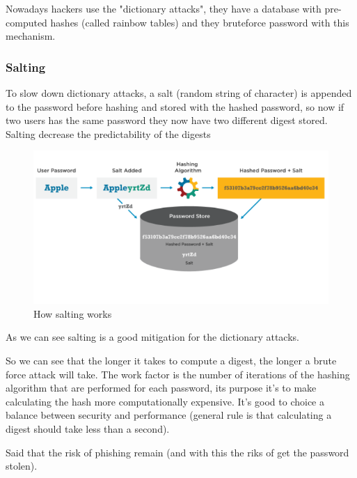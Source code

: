     Nowadays hackers use the "dictionary attacks", they have a database with pre-computed hashes (called rainbow tables) and they bruteforce password with this mechanism.
    
    \subsubsection{Salting}
    To slow down dictionary attacks, a salt (random string of character) is appended to the password before hashing and stored with the hashed password, so now if two users has the same password they now have two different digest stored. Salting decrease the predictability of the digests
    
    \begin{figure}[h!]
        \centering
        \includegraphics[scale=0.5]{images/prova.png}
        \caption{How salting works}
        \label{fig:salt}
    \end{figure}
    
    \FloatBarrier   
    
    As we can see salting is a good mitigation for the dictionary attacks.

    So we can see that the longer it takes to compute a digest, the longer a brute force attack will take. The work factor is the number of iterations of the hashing algorithm that are performed for each password, its purpose it's to make calculating the hash more computationally expensive. It's good to choice a balance between security and performance (general rule is that calculating a digest should take less than a second).

    Said that the risk of phishing remain (and with this the riks of get the password stolen).
    
